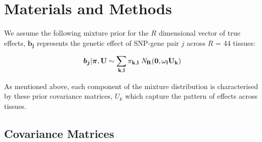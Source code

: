 \documentclass[10pt,letterpaper]{article}
\begin{document}
%
%
%
%

\section*{Materials and Methods}

We assume the following mixture prior for the $R$ dimensional vector of true effects,  $\bm{b_{j}}$ represents the genetic effect of SNP-gene pair $j$ across $R$ = 44 tissues:

 \begin{equation}
  \bm{b_{j}} | \bm{\pi},\bf{U} \sim \sum_{k,l} \pi_{k,l} \;{\it N}_R(\bm{0}, \omega_l U_{k})
\end{equation}


As mentioned above, each component of the mixture distribution is characterised by these prior covariance matrices, $U_{k}$ which capture the pattern of effects across tissues.
\subsection{ Covariance Matrices}
\end{document}
